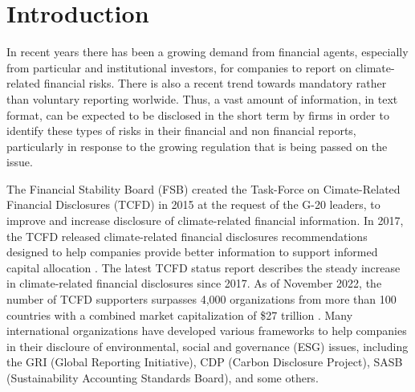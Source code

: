 \documentclass[runningheads]{llncs}
\begin{document}

\section{Introduction}
In recent years there has been a growing demand from financial agents, especially from particular and institutional investors, for companies to report on climate-related financial risks. There is also a recent trend towards mandatory rather than voluntary reporting worlwide. Thus, a vast amount of information, in text format, can be expected to be disclosed in the short term by firms in order to identify these types of risks in their financial and non financial reports, particularly in response to the growing regulation that is being passed on the issue.   

The Financial Stability Board (FSB) created the Task-Force on Cimate-Related Financial Disclosures (TCFD) in 2015 at the request of the G-20 leaders, to improve and increase disclosure of climate-related financial information. In 2017, the TCFD released climate-related financial disclosures recommendations designed to help companies provide better information to support informed capital allocation \cite{board2017recommendations}. The latest TCFD status report describes the steady increase in climate-related financial disclosures since 2017. As of November 2022, the number of TCFD supporters surpasses 4,000 organizations from more than 100 countries with a combined market capitalization of \$27 trillion \cite{board2022task}. Many international organizations have developed various frameworks to help companies in their discloure of environmental, social and governance (ESG) issues, including the GRI (Global Reporting Initiative), CDP (Carbon Disclosure Project), SASB (Sustainability Accounting Standards Board), and some others. 
\end{document}
